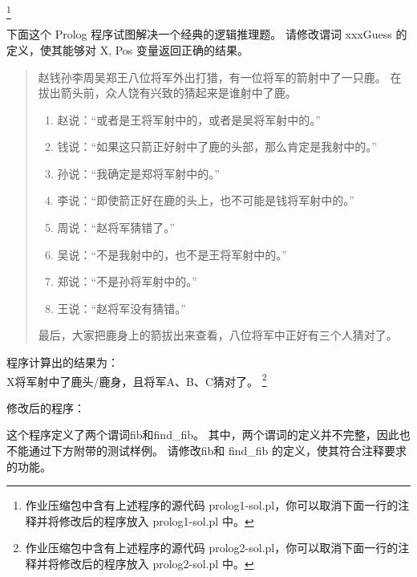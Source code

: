 \documentclass[a4paper, justified]{tufte-handout}
\begin{document}
\begin{solution}
  \footnote{作业压缩包中含有上述程序的源代码 prolog1-sol.pl，你可以取消下面一行的注释并将修改后的程序放入 prolog1-sol.pl 中。}

  
\end{solution}

\begin{problem}
下面这个 Prolog 程序试图解决一个经典的逻辑推理题。
请修改谓词 xxxGuess 的定义，使其能够对 X, Pos 变量返回正确的结果。

\begin{quote}
  赵钱孙李周吴郑王八位将军外出打猎，有一位将军的箭射中了一只鹿。
  在拔出箭头前，众人饶有兴致的猜起来是谁射中了鹿。
  \begin{enumerate}
    \item 赵说：“或者是王将军射中的，或者是吴将军射中的。”
    \item 钱说：“如果这只箭正好射中了鹿的头部，那么肯定是我射中的。”
    \item 孙说：“我确定是郑将军射中的。”
    \item 李说：“即使箭正好在鹿的头上，也不可能是钱将军射中的。”
    \item 周说：“赵将军猜错了。”
    \item 吴说：“不是我射中的，也不是王将军射中的。”
    \item 郑说：“不是孙将军射中的。”
    \item 王说：“赵将军没有猜错。”
  \end{enumerate}
  最后，大家把鹿身上的箭拔出来查看，八位将军中正好有三个人猜对了。
\end{quote}


\end{problem}

\begin{solution}
  程序计算出的结果为：\\
  X将军射中了鹿头/鹿身，且将军A、B、C猜对了。
  \footnote{作业压缩包中含有上述程序的源代码 prolog2-sol.pl，你可以取消下面一行的注释并将修改后的程序放入 prolog2-sol.pl 中。}

  修改后的程序：\\
  
\end{solution}


\begin{problem}
这个程序定义了两个谓词fib和find\_fib。
其中，两个谓词的定义并不完整，因此也不能通过下方附带的测试样例。
请修改fib和 find\_fib 的定义，使其符合注释要求的功能。



\end{problem}
\end{document}
